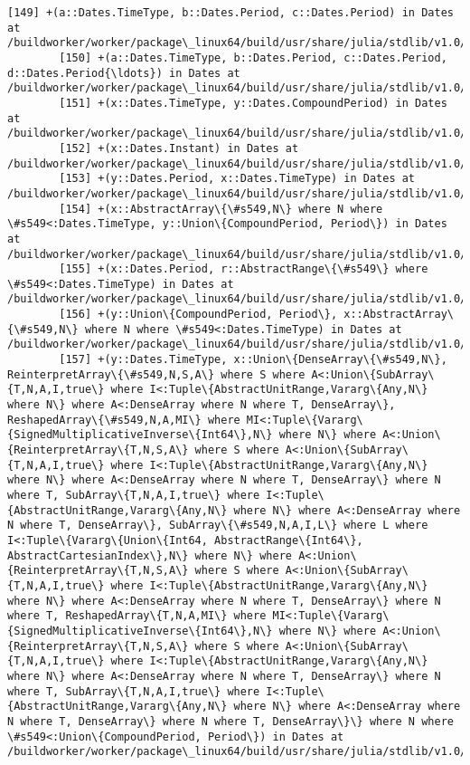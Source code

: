 \documentclass[11pt]{article}
\begin{document}
\begin{Verbatim}[commandchars=\\\{\}]
        [149] +(a::Dates.TimeType, b::Dates.Period, c::Dates.Period) in Dates at /buildworker/worker/package\_linux64/build/usr/share/julia/stdlib/v1.0/Dates/src/periods.jl:376
        [150] +(a::Dates.TimeType, b::Dates.Period, c::Dates.Period, d::Dates.Period{\ldots}) in Dates at /buildworker/worker/package\_linux64/build/usr/share/julia/stdlib/v1.0/Dates/src/periods.jl:377
        [151] +(x::Dates.TimeType, y::Dates.CompoundPeriod) in Dates at /buildworker/worker/package\_linux64/build/usr/share/julia/stdlib/v1.0/Dates/src/periods.jl:380
        [152] +(x::Dates.Instant) in Dates at /buildworker/worker/package\_linux64/build/usr/share/julia/stdlib/v1.0/Dates/src/arithmetic.jl:4
        [153] +(y::Dates.Period, x::Dates.TimeType) in Dates at /buildworker/worker/package\_linux64/build/usr/share/julia/stdlib/v1.0/Dates/src/arithmetic.jl:84
        [154] +(x::AbstractArray\{\#s549,N\} where N where \#s549<:Dates.TimeType, y::Union\{CompoundPeriod, Period\}) in Dates at /buildworker/worker/package\_linux64/build/usr/share/julia/stdlib/v1.0/Dates/src/arithmetic.jl:86
        [155] +(x::Dates.Period, r::AbstractRange\{\#s549\} where \#s549<:Dates.TimeType) in Dates at /buildworker/worker/package\_linux64/build/usr/share/julia/stdlib/v1.0/Dates/src/ranges.jl:57
        [156] +(y::Union\{CompoundPeriod, Period\}, x::AbstractArray\{\#s549,N\} where N where \#s549<:Dates.TimeType) in Dates at /buildworker/worker/package\_linux64/build/usr/share/julia/stdlib/v1.0/Dates/src/arithmetic.jl:88
        [157] +(y::Dates.TimeType, x::Union\{DenseArray\{\#s549,N\}, ReinterpretArray\{\#s549,N,S,A\} where S where A<:Union\{SubArray\{T,N,A,I,true\} where I<:Tuple\{AbstractUnitRange,Vararg\{Any,N\} where N\} where A<:DenseArray where N where T, DenseArray\}, ReshapedArray\{\#s549,N,A,MI\} where MI<:Tuple\{Vararg\{SignedMultiplicativeInverse\{Int64\},N\} where N\} where A<:Union\{ReinterpretArray\{T,N,S,A\} where S where A<:Union\{SubArray\{T,N,A,I,true\} where I<:Tuple\{AbstractUnitRange,Vararg\{Any,N\} where N\} where A<:DenseArray where N where T, DenseArray\} where N where T, SubArray\{T,N,A,I,true\} where I<:Tuple\{AbstractUnitRange,Vararg\{Any,N\} where N\} where A<:DenseArray where N where T, DenseArray\}, SubArray\{\#s549,N,A,I,L\} where L where I<:Tuple\{Vararg\{Union\{Int64, AbstractRange\{Int64\}, AbstractCartesianIndex\},N\} where N\} where A<:Union\{ReinterpretArray\{T,N,S,A\} where S where A<:Union\{SubArray\{T,N,A,I,true\} where I<:Tuple\{AbstractUnitRange,Vararg\{Any,N\} where N\} where A<:DenseArray where N where T, DenseArray\} where N where T, ReshapedArray\{T,N,A,MI\} where MI<:Tuple\{Vararg\{SignedMultiplicativeInverse\{Int64\},N\} where N\} where A<:Union\{ReinterpretArray\{T,N,S,A\} where S where A<:Union\{SubArray\{T,N,A,I,true\} where I<:Tuple\{AbstractUnitRange,Vararg\{Any,N\} where N\} where A<:DenseArray where N where T, DenseArray\} where N where T, SubArray\{T,N,A,I,true\} where I<:Tuple\{AbstractUnitRange,Vararg\{Any,N\} where N\} where A<:DenseArray where N where T, DenseArray\} where N where T, DenseArray\}\} where N where \#s549<:Union\{CompoundPeriod, Period\}) in Dates at /buildworker/worker/package\_linux64/build/usr/share/julia/stdlib/v1.0/Dates/src/arithmetic.jl:89

\end{Verbatim}
\end{document}
